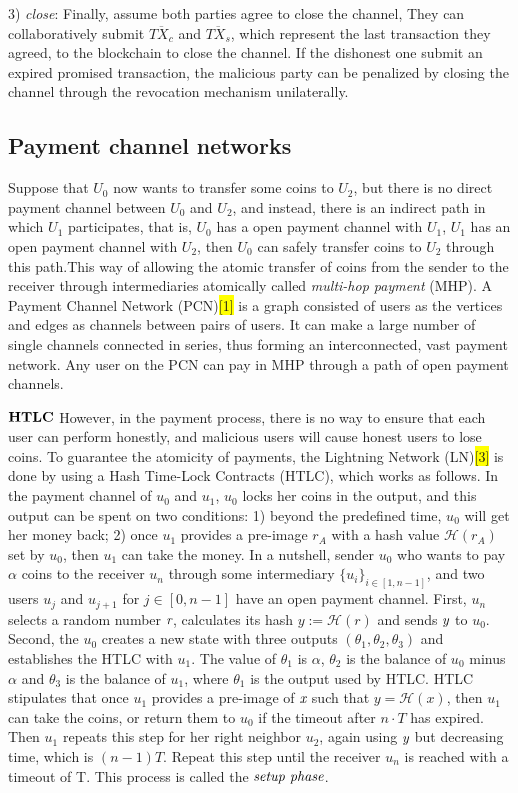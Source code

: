 \documentclass[conference]{IEEEtran}
\begin{document}
3) \emph{close}: Finally, assume both parties agree to close the channel, They can collaboratively submit $\overline{TX_c}$ 
and $\overline{TX_s}$, which represent the last transaction they agreed, to the blockchain to close the channel. If the 
dishonest one submit an expired promised transaction, the malicious party can be penalized by closing the channel through 
the revocation mechanism unilaterally.

\subsection{Payment channel networks}
Suppose that $U_0$ now wants to transfer some coins to $U_2$, but there is no direct payment channel between $U_0$ and $U_2$, 
and instead, there is an indirect path in which $U_1$ participates, that is, $U_0$ has a open payment channel with $U_1$, $U_1$ 
has an open payment channel with $U_2$, then $U_0$ can safely transfer coins to $U_2$ through this path.This way of allowing 
the atomic transfer of coins from the sender to the receiver through intermediaries atomically called \emph{multi-hop payment} (MHP). 
A Payment Channel Network (PCN)\colorbox{yellow}{[1]} is a graph consisted of users as the vertices and edges as channels between 
pairs of users. It can make a large number of single channels connected in series, thus forming an interconnected, vast payment network. 
Any user on the PCN can pay in MHP through a path of open payment channels. 

\noindent $\bf{HTLC}$ However, in the payment process, there is no way to ensure that each user can perform honestly, and malicious 
users will cause honest users to lose coins. To guarantee the atomicity of payments, the Lightning Network (LN)\colorbox{yellow}{[3]} 
is done by using a Hash Time-Lock Contracts (HTLC), which works as follows. In the payment channel of $u_0$ and $u_1$, $u_0$ locks her 
coins in the output, and this output can be spent on two conditions: 1) beyond the predefined time, $u_0$ will get her money back; 
2) once $u_1$ provides a pre-image $r_A$ with a hash value $\mathcal H(r_A)$ set by $u_0$, then $u_1$ can take the money. In a nutshell, 
sender $u_0$ who wants to pay $\alpha$ coins to the receiver $u_n$ through some intermediary ${\{u_i\}}_{i\in[1,n-1]}$, and two users 
$u_j$ and $u_{j+1}$ for $j \in [0,n-1]$ have an open payment channel. First, $u_n$ selects a random number $\emph{r}$, calculates its 
hash $y:= \mathcal H(r)$ and sends $\emph{y}$ to $u_0$. Second, the $u_0$ creates a new state with three outputs $(\theta_1, \theta_2, \theta_3)$ 
and establishes the HTLC with $u_1$. The value of $\theta_1$ is $\alpha$, $\theta_2$ is the balance of $u_0$ minus $\alpha$ and $\theta_3$ is 
the balance of $u_1$, where $\theta_1$ is the output used by HTLC. HTLC stipulates that once $u_1$ provides a pre-image of $\emph{x}$ such that 
$y = \mathcal H(x)$, then $u_1$ can take the coins, or return them to $u_0$ if the timeout after $n\cdot T$ has expired. Then $u_1$ repeats 
this step for her right neighbor $u_2$, again using $\emph{y}$ but decreasing time, which is $(n-1)T$. Repeat this step until the 
receiver $u_n$ is reached with a timeout of T. This process is called the $\emph{setup phase}$. 
\end{document}

